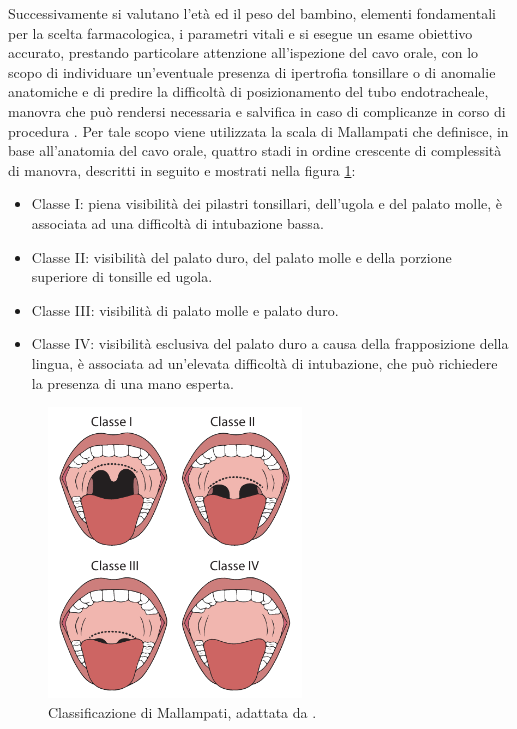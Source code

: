 Successivamente si valutano l'età ed il peso del bambino, elementi fondamentali per la scelta farmacologica, i parametri vitali e si esegue un esame obiettivo accurato, prestando particolare attenzione all'ispezione del cavo orale, con lo scopo di individuare un'eventuale presenza di ipertrofia tonsillare o di anomalie anatomiche e di predire la difficoltà di posizionamento del tubo endotracheale, manovra che può rendersi necessaria e salvifica in caso di complicanze in corso di procedura \cite{Guidelines2019}. Per tale scopo viene utilizzata la scala di Mallampati che definisce, in base all'anatomia del cavo orale, quattro stadi in ordine crescente di complessità di manovra, descritti in seguito e mostrati nella figura \ref{fig:mallampati}:

\begin{itemize}
    \item Classe I: piena visibilità dei pilastri tonsillari, dell'ugola e del palato molle, è associata ad una difficoltà di intubazione bassa.
    \item Classe II: visibilità del palato duro, del palato molle e della porzione superiore di tonsille ed ugola.
    \item Classe III: visibilità di palato molle e palato duro.
    \item Classe IV: visibilità esclusiva del palato duro a causa della frapposizione della lingua, è associata ad un'elevata difficoltà di intubazione, che può richiedere la presenza di una mano esperta. 
\end{itemize}

\bigskip

\begin{figure}[h]
    \centering
    \includegraphics[width=0.6\textwidth]{Figure/mallampatpdf.pdf}
    \caption{Classificazione di Mallampati, adattata da \cite{Vargo2012}.}
    \label{fig:mallampati}
\end{figure}

